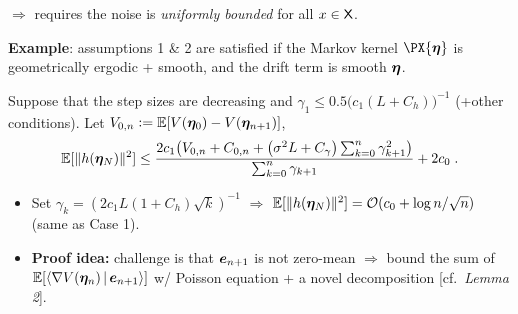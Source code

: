 \documentclass[a0,landscape]{a0poster}
\theoremstyle{definition}
\begin{document}
\begin{multicols}{3}
\begin{tcolorbox}[colback=white!5!white,colframe=red!75!black,fonttitle=\sffamily\bfseries\large,title=Global Convergence Analysis]
\begin{enumerate}
$\Longrightarrow$ requires the noise is \emph{\color{red}uniformly bounded} for all $x \in \mathsf{X}$.
\end{enumerate}
\textbf{Example}: assumptions 1 \& 2 are satisfied if the Markov kernel $\PX{\prm}$ is geometrically ergodic + smooth, and the drift term is smooth \wrt $\bm{\eta}$. 
\begin{theo}\vspace{-.5cm}Suppose that
the step sizes are decreasing and $\gamma_1 \leq 0.5 \big( c_1(L+C_h) \big)^{-1}$ (+other conditions). 
Let $V_{0,n} \mathrel{\mathop:}= \mathbb{E}[ V(\bm{\eta}_0) - V(\bm{\eta}_{n+1})]$,
{\large\[
 \EE [\| h( \prm_N ) \|^2 ] \leq
 \frac{ 2c_1 \big( V_{0,n} + C_{0,n} + \big( \sigma^2 L + C_\gamma \big) \sum_{k=0}^{n}
 \gamma_{k+1}^2 \big) }{ \sum_{k=0}^n \gamma_{k+1} } + 2 c_0 \eqsp.\vspace{-.1cm}
\]}
\end{theo}\vspace{-.2cm}
\begin{itemize}
\item Set $\gamma_k = (2 c_1 L (1+C_h) \sqrt{k})^{-1}$ $\Longrightarrow$ 
{\color{red}$\mathbb{E} [ \|h( \bm{\eta}_N ) \|^2 ] = {\cal O}( c_0 + \log n / \sqrt{n} )$} (same as Case 1).
\item \textbf{Proof idea:} challenge is that $\bm{e}_{n+1}$ is not zero-mean $\Longrightarrow$ bound the sum of $\mathbb{E}[ \left\langle {\nabla} V(\bm{\eta}_n) \,|\, \bm{e}_{n+1}  \right\rangle ]$ w/ Poisson equation + a novel decomposition [cf.~\emph{\color{blue}Lemma 2}].
\end{itemize}
\vspace{.1cm}
\end{tcolorbox}



\end{multicols}
\end{document}
